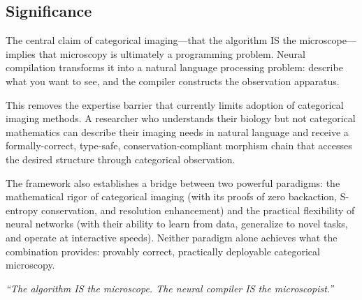 \documentclass[11pt,twocolumn,a4paper]{article}
\theoremstyle{definition}
\theoremstyle{remark}
\begin{document}
\subsection{Significance}

The central claim of categorical imaging---that the algorithm IS the microscope---implies that microscopy is ultimately a programming problem. Neural compilation transforms it into a natural language processing problem: describe what you want to see, and the compiler constructs the observation apparatus.

This removes the expertise barrier that currently limits adoption of categorical imaging methods. A researcher who understands their biology but not categorical mathematics can describe their imaging needs in natural language and receive a formally-correct, type-safe, conservation-compliant morphism chain that accesses the desired structure through categorical observation.

The framework also establishes a bridge between two powerful paradigms: the mathematical rigor of categorical imaging (with its proofs of zero backaction, S-entropy conservation, and resolution enhancement) and the practical flexibility of neural networks (with their ability to learn from data, generalize to novel tasks, and operate at interactive speeds). Neither paradigm alone achieves what the combination provides: provably correct, practically deployable categorical microscopy.

\vspace{1em}
\noindent\textit{``The algorithm IS the microscope. The neural compiler IS the microscopist.''}



\end{document}

